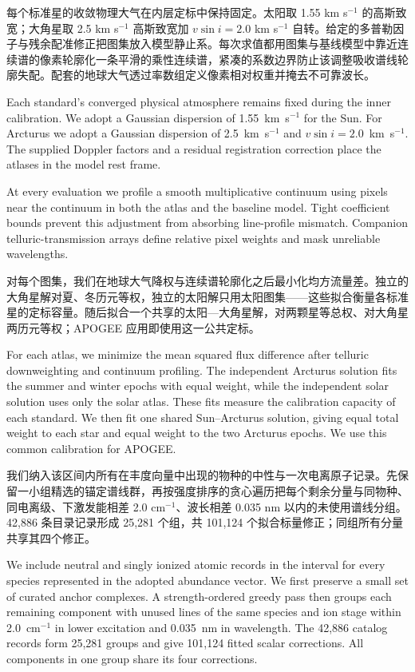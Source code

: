 每个标准星的收敛物理大气在内层定标中保持固定。太阳取 1.55 km s$^{-1}$ 的高斯致宽；大角星取 2.5 km s$^{-1}$ 高斯致宽加 $v\sin i=2.0$ km s$^{-1}$ 自转。给定的多普勒因子与残余配准修正把图集放入模型静止系。每次求值都用图集与基线模型中靠近连续谱的像素轮廓化一条平滑的乘性连续谱，紧凑的系数边界防止该调整吸收谱线轮廓失配。配套的地球大气透过率数组定义像素相对权重并掩去不可靠波长。

\begin{EN}
Each standard's converged physical atmosphere remains fixed during the inner calibration. We adopt a
Gaussian dispersion of 1.55~km~s$^{-1}$ for the Sun. For Arcturus we adopt a Gaussian
dispersion of 2.5~km~s$^{-1}$ and $v\sin i=2.0$~km~s$^{-1}$. The supplied Doppler
factors and a residual registration correction place the atlases in the model
rest frame.

At every evaluation we profile a smooth multiplicative continuum using pixels
near the continuum in both the atlas and the baseline model. Tight coefficient
bounds prevent this adjustment from absorbing line-profile mismatch.
Companion telluric-transmission arrays define relative pixel weights and mask
unreliable wavelengths.
\end{EN}

对每个图集，我们在地球大气降权与连续谱轮廓化之后最小化均方流量差。独立的大角星解对夏、冬历元等权，独立的太阳解只用太阳图集——这些拟合衡量各标准星的定标容量。随后拟合一个共享的太阳—大角星解，对两颗星等总权、对大角星两历元等权；APOGEE 应用即使用这一公共定标。

\begin{EN}
For each atlas, we minimize the mean squared flux difference after telluric
downweighting and continuum profiling. The independent Arcturus solution fits
the summer and winter epochs with equal weight, while the independent solar
solution uses only the solar atlas. These fits measure the calibration capacity
of each standard. We then fit one shared Sun--Arcturus solution, giving equal
total weight to each star and equal weight to the two Arcturus epochs. We use
this common calibration for APOGEE.
\end{EN}

我们纳入该区间内所有在丰度向量中出现的物种的中性与一次电离原子记录。先保留一小组精选的锚定谱线群，再按强度排序的贪心遍历把每个剩余分量与同物种、同电离级、下激发能相差 2.0 cm$^{-1}$、波长相差 0.035 nm 以内的未使用谱线分组。42,886 条目录记录形成 25,281 个组，共 101,124 个拟合标量修正；同组所有分量共享其四个修正。

\begin{EN}
We include neutral and singly ionized atomic records in the interval for every
species represented in the adopted abundance vector. We first preserve a small
set of curated anchor complexes. A strength-ordered greedy pass then groups
each remaining component with unused lines of the same species and ion stage
within 2.0~cm$^{-1}$ in lower excitation and 0.035~nm in wavelength. The 42,886
catalog records form 25,281 groups and give 101,124 fitted scalar corrections.
All components in one group share its four corrections.
\end{EN}

